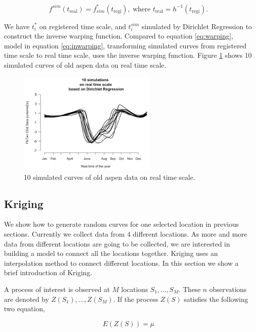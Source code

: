 \documentclass{article}
\begin{document}
\begin{equation}\label{eq:inwarping}
f^{sim}(t_{\textrm{real}}) = f^{*}_{sim}(t_{\textrm{regi}}),\;\textrm{where } t_\textrm{real}=h^{-1}(t_{\textrm{regi}}).
\end{equation}

We have $t_i^{*}$ on registered time scale, and $t_i^{sim}$ simulated by Dirichlet Regression to construct the inverse warping function.
Compared to equation \ref{eq:warping}, model in equation \ref{eq:inwarping}, transforming simulated curves from registered time scale to real time scale, uses the inverse warping function. 
Figure \ref{Fig:RealSimu} shows 10 simulated curves of old aspen data on real time scale.

\begin{figure}[!ht]
\centering
\includegraphics[width=0.6\textwidth]{RealSimu.png}
\caption{10 simulated curves of old aspen data on real time scale.}\label{Fig:RealSimu}
\end{figure}

\subsection{Kriging}\label{SubSec:Kriging}

We show how to generate random curves for one selected location in previous sections.  Currently we collect data from 4 different locations. As more and more data from different locations are going to be collected, we are interested in building a model to connect all the locations together. Kriging uses an interpolation method to connect different locations. In this section we show a brief introduction of Kriging. 

A process of interest is observed at $M$ locations $S_1,\dots,S_M$. These $n$ observations are denoted by $Z(S_1),\dots,Z(S_M)$. If the process $Z(S)$ satisfies the following two equation,

\begin{equation}
E(Z(S))=\mu
\end{equation}
\end{document}
